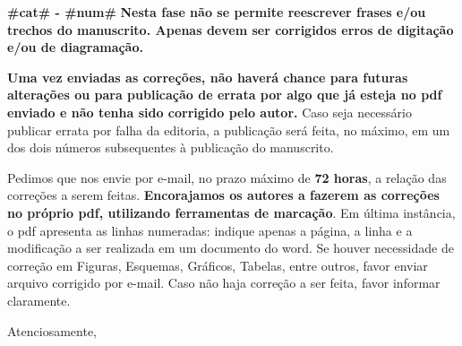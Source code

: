 \documentclass[12pt]{letter}
\begin{document}
\begin{letter}{\bfseries #cat# - #num#}
{\bfseries Nesta fase não se permite reescrever frases e/ou trechos do manuscrito. Apenas devem ser corrigidos erros de digitação e/ou de diagramação.}

{\bfseries Uma vez enviadas as correções, não haverá chance para futuras alterações ou para publicação de errata por algo que já esteja no pdf enviado e não tenha sido corrigido pelo autor.} Caso seja necessário publicar errata por falha da editoria, a publicação será feita, no máximo, em um dos dois números subsequentes à publicação do manuscrito.

Pedimos que nos envie por e-mail, no prazo máximo de {\bfseries 72 horas}, a relação das correções a serem feitas. {\bfseries Encorajamos os autores a fazerem as correções no próprio pdf, utilizando ferramentas de marcação}. Em última instância, o pdf apresenta as linhas numeradas: indique apenas a página, a linha e a modificação a ser realizada em um documento do word. Se houver necessidade de correção em Figuras, Esquemas, Gráficos, Tabelas, entre outros, favor enviar arquivo corrigido por e-mail. Caso não haja correção a ser feita, favor informar claramente.

\closing{Atenciosamente,}


\end{letter}
\end{document}
